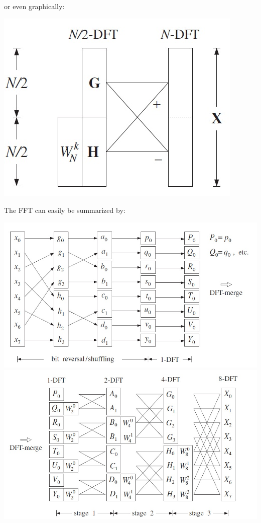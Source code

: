 or even graphically:
\begin{center}
	\includegraphics[width=0.5\linewidth]{images/DFT_FFT_butterfly.jpg}
\end{center}

The FFT can easily be summarized by:
\begin{center}
	\includegraphics[width=\linewidth]{images/DFT_FFT_step1.jpg}
	\includegraphics[width=\linewidth]{images/DFT_FFT_step2.jpg}
\end{center}

